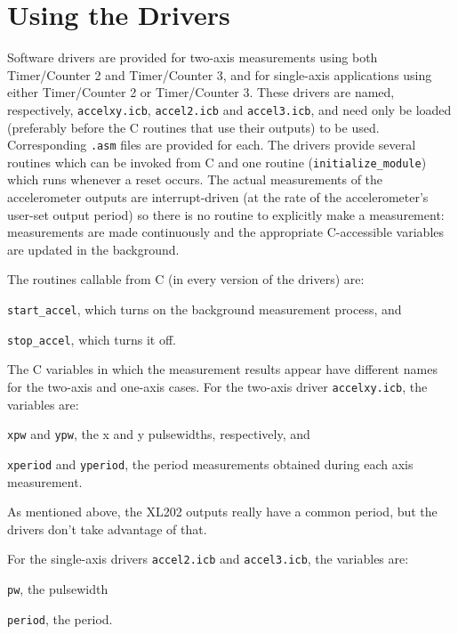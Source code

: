 \section{Using the Drivers}

Software drivers are provided for two-axis measurements using both
Timer/Counter 2 and Timer/Counter 3, and for single-axis applications
using either Timer/Counter 2 or Timer/Counter 3.  These drivers are
named, respectively, {\tt accelxy.icb}, {\tt accel2.icb} and {\tt accel3.icb}, and need
only be loaded (preferably before the C routines that use their
outputs) to be used.  Corresponding {\tt .asm} files are provided for each.
The drivers provide several routines which can be invoked from C and
one routine ({\tt initialize\_module}) which runs whenever a reset occurs.
The actual measurements of the accelerometer outputs are
interrupt-driven (at the rate of the accelerometer's user-set output
period) so there is no routine to explicitly make a measurement:
measurements are made continuously and the appropriate C-accessible
variables are updated in the background. 

The routines callable from C (in every version of the drivers) are:
\begin{description}
  \item{\tt start\_accel}, which turns on the background measurement process, and
  \item{\tt stop\_accel}, which turns it off.
\end{description}

The C variables in which the measurement results appear have different
names for the two-axis and one-axis cases.  For the two-axis driver
{\tt accelxy.icb}, the variables are: 
\begin{description}
  \item{{\tt xpw} and {\tt ypw}}, the x and y pulsewidths, respectively, and
  \item{{\tt xperiod} and {\tt yperiod}}, the period measurements obtained during each
  axis measurement. 
\end{description}

As mentioned above, the XL202 outputs really have a common period, but
the drivers don't take advantage of that. 

For the single-axis drivers {\tt accel2.icb} and {\tt accel3.icb}, the variables are:
\begin{description}
  \item{\tt pw}, the pulsewidth
  \item{\tt period}, the period.
\end{description}

